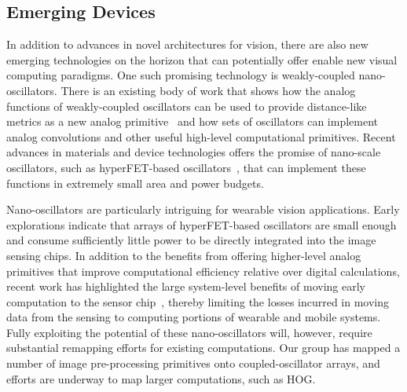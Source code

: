 \subsection{Emerging Devices}
In addition to advances in novel architectures for vision, there are
also new emerging technologies on the horizon that can potentially
offer enable new visual computing paradigms. One such promising
technology is weakly-coupled nano-oscillators. There is an existing
body of work that shows how the analog functions of weakly-coupled
oscillators can be used to provide distance-like metrics as a new
analog primitive~\cite{upitt} and how sets of oscillators can implement
analog convolutions and other useful high-level computational
primitives. Recent advances in materials and device technologies
offers the promise of nano-scale oscillators, such as hyperFET-based
oscillators~\cite{wtsai}, that can implement these functions in extremely
small area and power budgets.

Nano-oscillators are particularly intriguing for wearable vision
applications. Early explorations indicate that arrays of
hyperFET-based oscillators are small enough and consume sufficiently
little power to be directly integrated into the image sensing
chips. In addition to the benefits from offering higher-level analog
primitives that improve computational efficiency relative over digital
calculations, recent work has highlighted the large system-level
benefits of moving early computation to the sensor chip~\cite{redeye},
thereby limiting the losses incurred in moving data from the sensing
to computing portions of wearable and mobile systems. Fully exploiting
the potential of these nano-oscillators will, however, require
substantial remapping efforts for existing computations. Our group has
mapped a number of image pre-processing primitives onto
coupled-oscillator arrays, and efforts are underway to map larger
computations, such as HOG.
